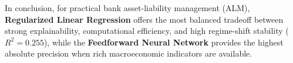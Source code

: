 In conclusion, for practical bank asset-liability management (ALM), \textbf{Regularized Linear Regression} offers the most balanced tradeoff between strong explainability, computational efficiency, and high regime-shift stability ($R^2 = 0.255$), while the \textbf{Feedforward Neural Network} provides the highest absolute precision when rich macroeconomic indicators are available.
